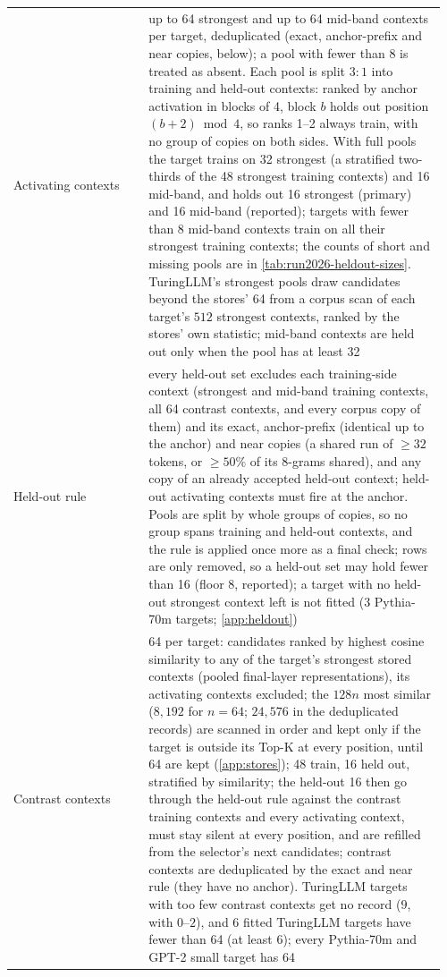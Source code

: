 \documentclass[10pt]{article}
\begin{document}
{\begin{longtable}{@{}p{0.30\linewidth}p{0.66\linewidth}@{}}
Activating contexts & up to 64 strongest and up to 64 mid-band contexts per target, deduplicated (exact, anchor-prefix and near copies, below); a pool with fewer than 8 is treated as absent. Each pool is split $3{:}1$ into training and held-out contexts: ranked by anchor activation in blocks of 4, block $b$ holds out position $(b + 2) \bmod 4$, so ranks 1--2 always train, with no group of copies on both sides. With full pools the target trains on 32 strongest (a stratified two-thirds of the 48 strongest training contexts) and 16 mid-band, and holds out 16 strongest (primary) and 16 mid-band (reported); targets with fewer than 8 mid-band contexts train on all their strongest training contexts; the counts of short and missing pools are in \cref{tab:run2026-heldout-sizes}. TuringLLM's strongest pools draw candidates beyond the stores' 64 from a corpus scan of each target's $512$ strongest contexts, ranked by the stores' own statistic; mid-band contexts are held out only when the pool has at least 32 \\
Held-out rule & every held-out set excludes each training-side context (strongest and mid-band training contexts, all 64 contrast contexts, and every corpus copy of them) and its exact, anchor-prefix (identical up to the anchor) and near copies (a shared run of $\geq 32$ tokens, or $\geq 50\%$ of its 8-grams shared), and any copy of an already accepted held-out context; held-out activating contexts must fire at the anchor. Pools are split by whole groups of copies, so no group spans training and held-out contexts, and the rule is applied once more as a final check; rows are only removed, so a held-out set may hold fewer than 16 (floor 8, reported); a target with no held-out strongest context left is not fitted (3 Pythia-70m targets; \cref{app:heldout}) \\
Contrast contexts & 64 per target: candidates ranked by highest cosine similarity to any of the target's strongest stored contexts (pooled final-layer representations), its activating contexts excluded; the $128n$ most similar ($8{,}192$ for $n = 64$; $24{,}576$ in the deduplicated records) are scanned in order and kept only if the target is outside its Top-K at every position, until 64 are kept (\cref{app:stores}); 48 train, 16 held out, stratified by similarity; the held-out 16 then go through the held-out rule against the contrast training contexts and every activating context, must stay silent at every position, and are refilled from the selector's next candidates; contrast contexts are deduplicated by the exact and near rule (they have no anchor). TuringLLM targets with too few contrast contexts get no record ($9$, with $0$--$2$), and $6$ fitted TuringLLM targets have fewer than 64 (at least $6$); every Pythia-70m and GPT-2 small target has 64 \\

\end{longtable}}
\end{document}
